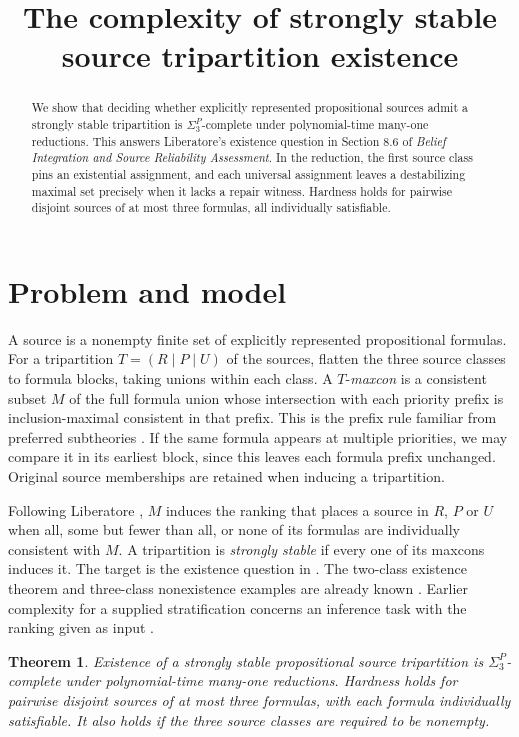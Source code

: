 \documentclass[11pt,a4paper]{amsart}
\title[Strongly stable source tripartition existence]{The complexity of strongly stable source tripartition existence}
\date{}
\newtheorem{theorem}{Theorem}
\begin{document}
\begin{abstract}
We show that deciding whether explicitly represented propositional sources admit a strongly stable tripartition is $\Sigma_3^P$-complete under polynomial-time many-one reductions. This answers Liberatore's existence question in Section 8.6 of \emph{Belief Integration and Source Reliability Assessment}. In the reduction, the first source class pins an existential assignment, and each universal assignment leaves a destabilizing maximal set precisely when it lacks a repair witness. Hardness holds for pairwise disjoint sources of at most three formulas, all individually satisfiable.
\end{abstract}
\maketitle

\section{Problem and model}
A source is a nonempty finite set of explicitly represented propositional formulas. For a tripartition $T=(R\mid P\mid U)$ of the sources, flatten the three source classes to formula blocks, taking unions within each class. A $T$-\emph{maxcon} is a consistent subset $M$ of the full formula union whose intersection with each priority prefix is inclusion-maximal consistent in that prefix. This is the prefix rule familiar from preferred subtheories \cite{brewka}. If the same formula appears at multiple priorities, we may compare it in its earliest block, since this leaves each formula prefix unchanged. Original source memberships are retained when inducing a tripartition.

Following Liberatore \cite[Definitions~1--4 and 11]{liberatore}, $M$ induces the ranking that places a source in $R$, $P$ or $U$ when all, some but fewer than all, or none of its formulas are individually consistent with $M$. A tripartition is \emph{strongly stable} if every one of its maxcons induces it. The target is the existence question in \cite[\S8.6, p.~137]{liberatore}. The two-class existence theorem and three-class nonexistence examples are already known \cite[Theorems~8 and 17]{liberatore}. Earlier complexity for a supplied stratification concerns an inference task with the ranking given as input \cite[Proposition~6]{coste}.

\begin{theorem}\label{thm:main}
Existence of a strongly stable propositional source tripartition is $\Sigma_3^P$-complete under polynomial-time many-one reductions. Hardness holds for pairwise disjoint sources of at most three formulas, with each formula individually satisfiable. It also holds if the three source classes are required to be nonempty.
\end{theorem}
\end{document}

